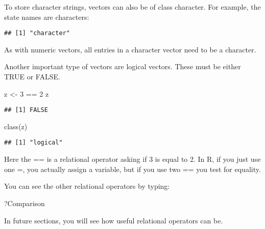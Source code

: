 \documentclass[
]{article}
\newenvironment{Shaded}{\begin{snugshade}}{\end{snugshade}}
\newcommand{\DecValTok}[1]{\textcolor[rgb]{0.00,0.00,0.81}{#1}}
\newcommand{\FunctionTok}[1]{\textcolor[rgb]{0.00,0.00,0.00}{#1}}
\newcommand{\NormalTok}[1]{#1}
\newcommand{\OtherTok}[1]{\textcolor[rgb]{0.56,0.35,0.01}{#1}}
\newcommand{\SpecialCharTok}[1]{\textcolor[rgb]{0.00,0.00,0.00}{#1}}
\begin{document}
To store character strings, vectors can also be of class character. For
example, the state names are characters:

\begin{Shaded}
\end{Shaded}

\begin{verbatim}
## [1] "character"
\end{verbatim}

As with numeric vectors, all entries in a character vector need to be a
character.

Another important type of vectors are logical vectors. These must be
either TRUE or FALSE.

\begin{Shaded}
\begin{Highlighting}[]
\NormalTok{z }\OtherTok{\textless{}{-}} \DecValTok{3} \SpecialCharTok{==} \DecValTok{2}
\NormalTok{z}
\end{Highlighting}
\end{Shaded}

\begin{verbatim}
## [1] FALSE
\end{verbatim}

\begin{Shaded}
\begin{Highlighting}[]
\FunctionTok{class}\NormalTok{(z)}
\end{Highlighting}
\end{Shaded}

\begin{verbatim}
## [1] "logical"
\end{verbatim}

Here the == is a relational operator asking if 3 is equal to 2. In R, if
you just use one =, you actually assign a variable, but if you use two
== you test for equality.

You can see the other relational operators by typing:

\begin{Shaded}
\begin{Highlighting}[]
\NormalTok{?Comparison}
\end{Highlighting}
\end{Shaded}

In future sections, you will see how useful relational operators can be.
\end{document}
